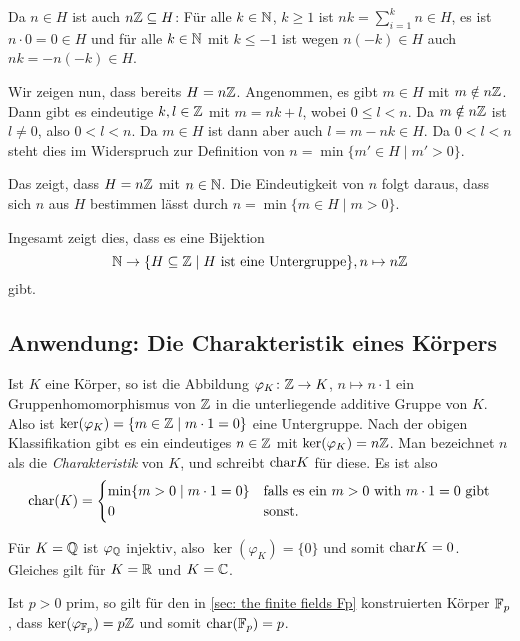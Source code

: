 Da $n \in H$ ist auch $n\mathbb{Z} \subseteq H$: Für alle $k \in \mathbb{N}$, $k \geq 1$ ist $n k = \sum_{i=1}^k n \in H$, es ist $n \cdot 0 = 0 \in H$ und für alle $k \in \mathbb{N}$ mit $k \leq -1$ ist wegen $n(-k) \in H$ auch $nk = -n(-k) \in H$.

Wir zeigen nun, dass bereits $H = n\mathbb{Z}$. Angenommen, es gibt $m \in H$ mit $m \notin n\mathbb{Z}$. Dann gibt es eindeutige $k,l \in \mathbb{Z}$ mit $m = nk + l$, wobei $0 \leq l < n$. Da $m \notin n\mathbb{Z}$ ist $l \neq 0$, also $0 < l < n$. Da $m \in H$ ist dann aber auch $l = m - nk \in H$. Da $0 < l < n$ steht dies im Widerspruch zur Definition von $n = \min \{m' \in H \mid m' > 0\}$.

Das zeigt, dass $H = n\mathbb{Z}$ mit $n \in \mathbb{N}$. Die Eindeutigkeit von $n$ folgt daraus, dass sich $n$ aus $H$ bestimmen lässt durch $n = \min \{m \in H \mid m > 0\}$.

Ingesamt zeigt dies, dass es eine Bijektion
\[
 \mathbb{N} \rightarrow \{H \subseteq \mathbb{Z} \mid \text{$H$ ist eine Untergruppe}\}, n \mapsto n\mathbb{Z}
\]
gibt.


\subsection{Anwendung: Die Charakteristik eines Körpers}
Ist $K$ eine Körper, so ist die Abbildung $\varphi_K \colon \mathbb{Z} \to K$, $n \mapsto n \cdot 1$ ein Gruppenhomomorphismus von $\mathbb{Z}$ in die unterliegende additive Gruppe von $K$. Also ist $\ker(\varphi_K) = \{m \in \mathbb{Z} \mid m \cdot 1 = 0\}$ eine Untergruppe. Nach der obigen Klassifikation gibt es ein eindeutiges $n \in \mathbb{Z}$ mit $\ker(\varphi_K) = n \mathbb{Z}$. Man bezeichnet $n$ als die \emph{Charakteristik} von $K$, und schreibt $\mathrm{char} K$ für diese. Es ist also
\[
 \mathrm{char}(K) =
 \begin{cases}
  \min\{m > 0 \mid m \cdot 1 = 0\} & \text{falls es ein $m > 0$ with $m \cdot 1 = 0$ gibt} \\
  0                                & \text{sonst}.
 \end{cases}
\]


\begin{bsp}
 Für $K = \mathbb{Q}$ ist $\varphi_{\mathbb{Q}}$ injektiv, also $\ker(\varphi_K) = \{0\}$ und somit $\mathrm{char} K = 0$. Gleiches gilt für $K = \mathbb{R}$ und $K = \mathbb{C}$.
 
 Ist $p > 0$ prim, so gilt für den in \ref{sec: the finite fields Fp} konstruierten Körper $\mathbb{F}_p$, dass $\ker(\varphi_{\mathbb{F}_p}) = p\mathbb{Z}$ und somit $\mathrm{char}(\mathbb{F}_p) = p$.
\end{bsp}

